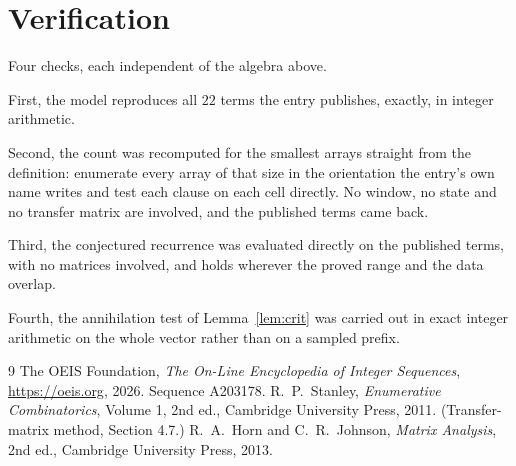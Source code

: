 \documentclass[11pt,a4paper]{article}
\theoremstyle{plain}
\theoremstyle{definition}
\begin{document}
\section{Verification}

Four checks, each independent of the algebra above.

First, the model reproduces all $22$ terms the entry publishes, exactly, in integer
arithmetic.

Second, the count was recomputed for the smallest arrays straight from the definition:
enumerate every array of that size in the orientation the entry's own name writes and test each
clause on each cell directly. No window, no state and no transfer matrix are involved, and the
published terms came back.

Third, the conjectured recurrence was evaluated directly on the published terms, with no
matrices involved, and holds wherever the proved range and the data overlap.

Fourth, the annihilation test of Lemma~\ref{lem:crit} was carried out in exact integer
arithmetic on the whole vector rather than on a sampled prefix.

\begin{thebibliography}{9}
 The OEIS Foundation, \emph{The On-Line Encyclopedia of Integer
Sequences}, \url{https://oeis.org}, 2026. Sequence A203178.
 R.~P.~Stanley, \emph{Enumerative Combinatorics}, Volume 1, 2nd ed.,
Cambridge University Press, 2011. (Transfer-matrix method, Section 4.7.)
 R.~A.~Horn and C.~R.~Johnson, \emph{Matrix Analysis}, 2nd ed., Cambridge
University Press, 2013.
\end{thebibliography}
\end{document}
